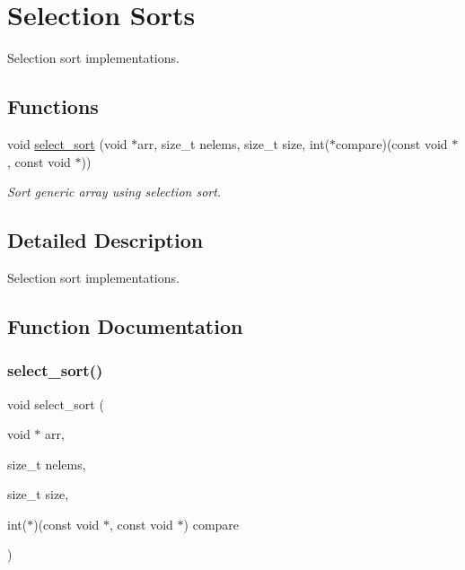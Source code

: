\hypertarget{group__SelectionSort}{}\section{Selection Sorts}
\label{group__SelectionSort}


Selection sort implementations.  


\subsection*{Functions}
\begin{DoxyCompactItemize}
\item 
void \hyperlink{group__SelectionSort_ga95d65a1979dccdbd2b5b599d0eeef339}{select\+\_\+sort} (void $\ast$arr, size\+\_\+t nelems, size\+\_\+t size, int($\ast$compare)(const void $\ast$, const void $\ast$))
\begin{DoxyCompactList}\small\item\em Sort generic array using selection sort. \end{DoxyCompactList}\end{DoxyCompactItemize}


\subsection{Detailed Description}
Selection sort implementations. 



\subsection{Function Documentation}
\mbox{\label{group__SelectionSort_ga95d65a1979dccdbd2b5b599d0eeef339}} 
\subsubsection{\texorpdfstring{select\+\_\+sort()}{select\_sort()}}
{\footnotesize\ttfamily void select\+\_\+sort (\begin{DoxyParamCaption}\item[{void $\ast$}]{arr,  }\item[{size\+\_\+t}]{nelems,  }\item[{size\+\_\+t}]{size,  }\item[{int($\ast$)(const void $\ast$, const void $\ast$)}]{compare }\end{DoxyParamCaption})}



